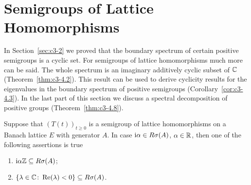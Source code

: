 \section{Semigroups of Lattice Homomorphisms}\label{sec:c3-4}
In Section~\ref{sec:c3-2} we proved that the boundary spectrum of certain positive semigroups is a cyclic set. 
For semigroups of lattice homomorphisms much more can be said. 
The whole spectrum is an imaginary additively cyclic subset of\/ $\mathbb{C} $ (\cf Theorem~\ref{thm:c3-4.2}). 
This result can be used to derive cyclicity results for the eigenvalues in the boundary spectrum of positive semigroups (\cf Corollary~\ref{cor:c3-4.3}). 
In the last part of this section we discuss a spectral decomposition of positive groups (\cf Theorem~\ref{thm:c3-4.8}).
\begin{lemma}\label{lem:c3-4.1}
	Suppose that $(T(t))_{t  \geq 0}$ is a semigroup of lattice homomorphisms on a Banach lattice $E$ with generator $A$.
	In case $\mathrm{i}\alpha \in R\sigma(A)$, $\alpha \in \mathbb{R} $, then one of the following assertions is true
	\begin{enumerate}[\upshape (a)]
		\item $\mathrm{i}\alpha\mathbb{Z} \subseteq R\sigma(A)$;
		\item $\{\lambda \in \mathbb{C}  \colon \mathop{}\!\mathrm{Re}(\lambda) < 0 \} \subseteq R\sigma(A)$.
	\end{enumerate}
\end{lemma}
